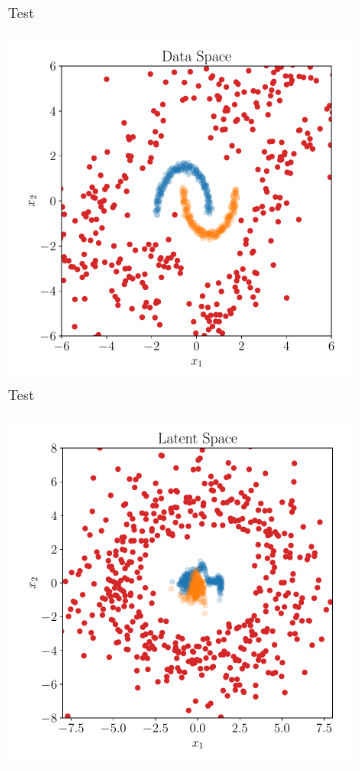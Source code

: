 \begin{figure}[htpb]
\begin{subfigure}[]{0.4\textwidth}
        \caption{Test}
        \label{fig:moons_latent_space}
    \end{subfigure}
    \begin{subfigure}[]{0.4\textwidth}
        \centering
    \includegraphics[width=\linewidth]{figures/toy_example/moons/gumbel_samples.pdf}
        \caption{Test}
        \label{fig:moons_sample_space_gumbel}
    \end{subfigure}
    \begin{subfigure}[]{0.4\textwidth}
        \centering
    \includegraphics[width=\linewidth]{figures/toy_example/moons/latent_space_with_outliers.pdf}

\end{subfigure}
\end{figure}
